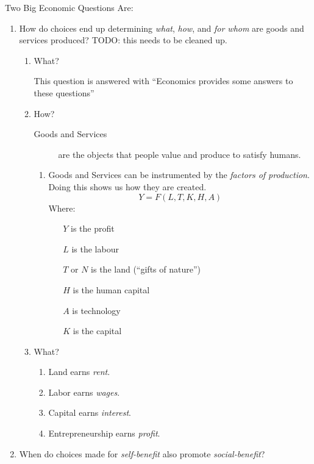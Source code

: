             Two Big Economic Questions Are:
            \begin{enumerate}
                \item How do choices end up determining \emph{what}, \emph{how}, and \emph{for whom} are goods and services produced?
                    TODO: this needs to be cleaned up.
                    \begin{enumerate}
                        \item What?

                            This question is answered with ``Economics provides some answers to these questions''
                        \item How?
                            \begin{description}
                                \item[Goods and Services] are the objects that people value and produce to satisfy humans.
                            \end{description}
                            \begin{enumerate}
                                \item Goods and Services can be instrumented by the \emph{factors of production}.
                                      Doing this shows us how they are created.
                                \[ Y = F ( L, T, K, H, A) \]
                                Where:
                                \begin{enumerate}
                                    \item[$Y$] is the profit
                                    \item[$L$] is the labour
                                    \item[$T$ or $N$] is the land (``gifts of nature'')
                                    \item[$H$] is the human capital
                                    \item[$A$] is technology
                                    \item[$K$] is the capital
                                \end{enumerate}
                            \end{enumerate}
                        \item What?
                            \begin{enumerate}
                                \item Land earns \emph{rent}.
                                \item Labor earns \emph{wages}.
                                \item Capital earns \emph{interest}.
                                \item Entrepreneurship earns \emph{profit}.
                            \end{enumerate}
                    \end{enumerate}
                \item When do choices made for \emph{self-benefit} also promote \emph{social-benefit}?


\end{enumerate}
